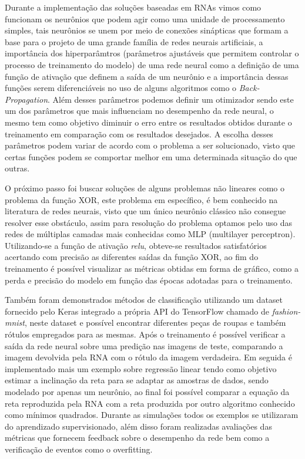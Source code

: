 \documentclass[12pt,openright,openany,oneside,article,a4paper,brazi]{abntex2}
\begin{document}
Durante a implementação das soluções baseadas em RNAs vimos como funcionam os neurônios que podem agir como uma unidade de processamento simples, tais neurônios
se unem por meio de conexões sinápticas que formam a base para o projeto de uma grande família de redes neurais artificiais, a importância dos hiperparâmtros (parâmetros ajustáveis que permitem controlar o processo de treinamento do modelo)
de uma rede neural como a definição de uma função de ativação que definem a saída de um neurônio e a importância dessas funções serem diferenciáveis no uso de alguns algoritmos 
como o \textit{Back-Propagation}. Além desses parâmetros podemos definir um otimizador sendo este um dos parâmetros que mais influenciam no 
desempenho da rede neural, o mesmo tem como objetivo diminuir o erro entre os resultados obtidos durante o treinamento em comparação com os resultados desejados. A escolha desses 
parâmetros podem variar de acordo com o problema a ser solucionado, visto que certas funções podem se comportar melhor em uma determinada situação do que outras.  

O próximo passo foi buscar soluções de alguns problemas não lineares como o problema da função XOR, este problema em específico, é bem conhecido na literatura de redes neurais, visto que
um único neurônio clássico não consegue resolver esse obstáculo, assim para resolução do problema optamos pelo uso das redes de múltiplas camadas mais conhecidas como MLP (multilayer perceptron).
Utilizando-se a função de ativação \textit{relu}, obteve-se resultados satisfatórios acertando com precisão as diferentes saídas da função XOR, ao fim do treinamento é possível visualizar as métricas obtidas em forma de gráfico, como a perda e precisão do 
modelo em função das épocas adotadas para o treinamento.

Também foram demonstrados métodos de classificação utilizando um dataset fornecido pelo Keras integrado a própria API do TensorFlow chamado de \textit{fashion-mnist}, neste dataset e possível encontrar 
diferentes peças de roupas e também rótulos empregados para as mesmas. Após o treinamento é possível verificar a saída da rede neural sobre uma predição nas imagens de teste, comparando a imagem devolvida pela RNA com o rótulo da imagem verdadeira. Em seguida é implementado mais um exemplo sobre 
regressão linear tendo como objetivo estimar a inclinação da reta para se adaptar as amostras de dados, sendo modelado por apenas um neurônio, ao final foi possível comparar a equação da reta reproduzida pela RNA 
com a reta produzida por outro algoritmo conhecido como mínimos quadrados. Durante as simulações todos os exemplos se utilizaram do aprendizado supervisionado, além disso foram realizadas avaliações
das métricas que fornecem feedback sobre o desempenho da rede bem como a verificação de eventos como o overfitting. 
\end{document}
